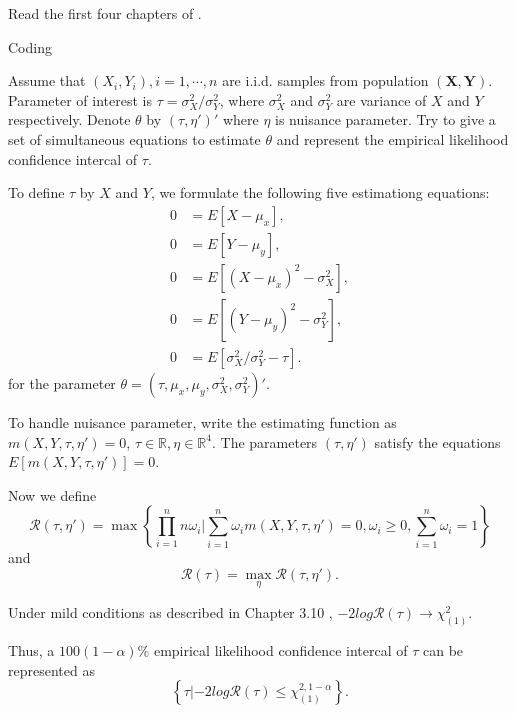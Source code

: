 
\begin{problem}
    Read the first four chapters of \citet{Owen2001}.
\end{problem}

\begin{problem}
    Coding
\end{problem}

\begin{problem}
    Assume that $(X_i,Y_i), i=1,\cdots,n$ are  i.i.d. samples from population $(\mathbf{X},\mathbf{Y})$. Parameter of interest is $\tau=\sigma^2_X / \sigma^2_Y$, where  $\sigma^2_X$ and $\sigma^2_Y$ are variance of $X$ and $Y$ respectively. Denote $\theta$ by $(\tau,\eta')'$ where $\eta$ is nuisance parameter. Try to give a set of simultaneous equations to estimate $\theta$ and represent the empirical likelihood confidence intercal of $\tau$.
\end{problem}

\begin{solution}
    To define $\tau$ by $X$ and $Y$, we formulate the following five estimationg equations:
    \begin{equation*}
        \begin{split}
            0 & = E[X-\mu_x], \\
            0 & = E[Y-\mu_y], \\
            0 & = E[(X-\mu_x)^2 - \sigma^2_X], \\
            0 & = E[(Y-\mu_y)^2 - \sigma^2_Y],\\
            0 & = E[\sigma^2_X / \sigma^2_Y - \tau].
        \end{split}
    \end{equation*}
    for the parameter $\theta=(\tau,\mu_x,\mu_y,\sigma^2_X, \sigma^2_Y)'$.

    To handle nuisance parameter, write the estimating function as $m(X,Y,\tau,\eta')=0$, $\tau\in \mathbb{R}, \eta\in \mathbb{R}^4$.
    The parameters $(\tau,\eta')$ satisfy the equations $E[m(X,Y,\tau,\eta')]=0$.

    Now we define 
    \begin{equation*}
        \mathcal{R}(\tau,\eta') = \max \left\{ \prod_{i=1}^n n\omega_i | \sum_{i=1}^n \omega_i m(X,Y,\tau,\eta') =0, \omega_i\ge 0, \sum_{i=1}^n \omega_i=1 \right\}
    \end{equation*}
    and
    \begin{equation*}
        \mathcal{R}(\tau) = \max_{\eta} \mathcal{R}(\tau,\eta') .
    \end{equation*}

    Under mild conditions as described in Chapter 3.10 \citep{Owen2001}, $-2log  \mathcal{R}(\tau) \to \chi^2_{(1)}$.

    Thus, a $100(1-\alpha)\%$ empirical likelihood confidence intercal of $\tau$ can be represented as 
    \begin{equation*}
        \left\{ \tau |  -2log \mathcal{R}(\tau) \le \chi^{2,1-\alpha}_{(1)}\right\}.
    \end{equation*}
\end{solution}




